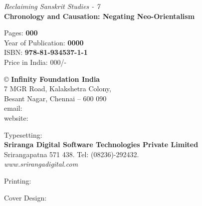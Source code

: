 \thispagestyle{empty}

\textit{Reclaiming Sanskrit Studies - 7}\\\textbf{Chronology and Causation: Negating Neo-Orientalism}

Pages: \textbf{000}\\ Year of Publication: \textbf{0000}\\ ISBN: \textbf{978-81-934537-1-1}\\ Price in India: 000/-

© \textbf{Infinity Foundation India}\\ 7 MGR Road, Kalakshetra Colony,\\ Besant Nagar, Chennai -- 600 090\\ email: \\ website: 

Typesetting:\\\textbf{Sriranga Digital Software Technologies Private Limited}\\ Srirangapatna 571 438. Tel: (08236)-292432.\\\textit{www.srirangadigital.com}

Printing: 

Cover Design:

